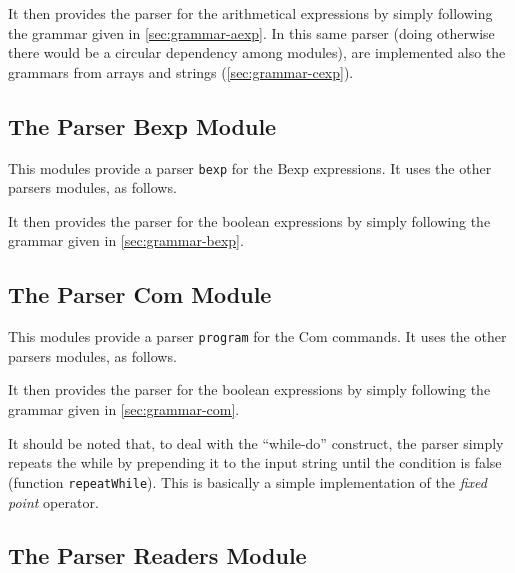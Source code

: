\documentclass{esposito-documentation}
\begin{document}


It then provides the parser for the arithmetical expressions by simply following
the grammar given in \autoref{sec:grammar-aexp}. In this same parser (doing
otherwise there would be a circular dependency among modules), are implemented
also the grammars from arrays and strings (\autoref{sec:grammar-cexp}).



\subsection{The Parser Bexp Module}


This modules provide a parser \lstinline|bexp| for the $\mathrm{Bexp}$
expressions. It uses the other parsers modules, as follows.



It then provides the parser for the boolean expressions by simply following the
grammar given in \autoref{sec:grammar-bexp}.



\subsection{The Parser Com Module}


This modules provide a parser \lstinline|program| for the $\mathrm{Com}$
commands. It uses the other parsers modules, as follows.



It then provides the parser for the boolean expressions by simply following the
grammar given in \autoref{sec:grammar-com}.



It should be noted that, to deal with the ``while-do'' construct, the parser
simply repeats the while by prepending it to the input string until the
condition is false (function \lstinline|repeatWhile|). This is basically a
simple implementation of the \emph{fixed point} operator.

\subsection{The Parser Readers Module}

\end{document}
